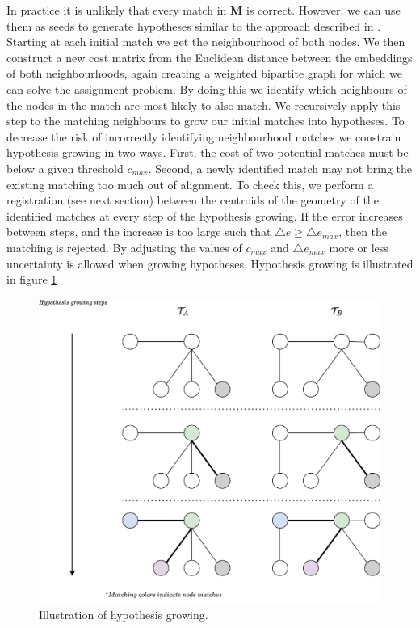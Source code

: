 In practice it is unlikely that every match in \(\mathbf{M}\) is correct. However, we can use them as seeds to generate hypotheses similar to the approach described in \citet{huang_topological_2005}. Starting at each initial match we get the neighbourhood of both nodes. We then construct a new cost matrix from the Euclidean distance between the embeddings of both neighbourhoods, again creating a weighted bipartite graph for which we can solve the assignment problem. By doing this we identify which neighbours of the nodes in the match are most likely to also match. We recursively apply this step to the matching neighbours to grow our initial matches into hypotheses. To decrease the risk of incorrectly identifying neighbourhood matches we constrain hypothesis growing in two ways. First, the cost of two potential matches must be below a given threshold \(c_{max}\). Second, a newly identified match may not bring the existing matching too much out of alignment. To check this, we perform a registration (see next section) between the centroids of the geometry of the identified matches at every step of the hypothesis growing. If the error increases between steps, and the increase is too large such that \(\triangle e \geq \triangle e_{max} \), then the matching is rejected. By adjusting the values of \(c_{max}\) and \(\triangle e_{max}\) more or less uncertainty is allowed when growing hypotheses. Hypothesis growing is illustrated in figure \ref{fig:hgrowing}

\begin{figure}[h]
    \centering
    \includegraphics*[width=\textwidth]{./fig/hypothesis_growing.drawio.pdf}
    \caption{Illustration of hypothesis growing.}
    \label{fig:hgrowing}
\end{figure}
